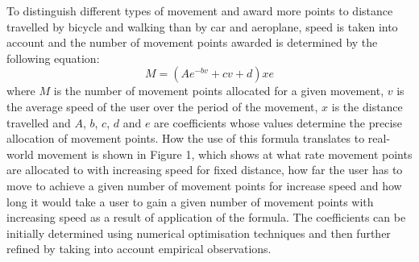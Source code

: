 \documentclass[12pt,a4paper,twoside]{article}
\begin{document}
To distinguish different types of movement and award more points to distance travelled by bicycle and walking than by car and aeroplane, speed is taken into account and the number of movement points awarded is determined by the following equation:
\begin{equation}
\label{eq:mpoints}
M = \left({Ae^{-bv}+cv+d}\right)xe
\end{equation}
where $M$ is the number of movement points allocated for a given movement, $v$ is the average speed of the user over the period of the movement, $x$ is the distance travelled and $A$, $b$, $c$, $d$ and $e$ are coefficients whose values determine the precise allocation of movement points. How the use of this formula translates to real-world movement is shown in Figure 1, which shows at what rate movement points are allocated to with increasing speed for fixed distance, how far the user has to move to achieve a given number of movement points for increase speed and how long it would take a user to gain a given number of movement points with increasing speed as a result of application of the formula. The coefficients can be initially determined using numerical optimisation techniques and then further refined by taking into account empirical observations.
\end{document}

